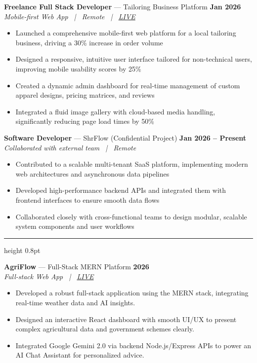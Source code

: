 \documentclass[10pt,a4paper]{article}
\newcommand{\resumesection}[1]{%
  \vspace{5pt}%
  \noindent{\large\textbf{#1}}\par
  \vspace{1pt}%
  \hrule height 0.8pt
  \vspace{3pt}%
}
\begin{document}
\noindent\textbf{Freelance Full Stack Developer} --- Tailoring Business Platform \hfill \textbf{Jan 2026} \\
\textit{Mobile-first Web App \ | \ Remote \ | \ \href{https://tailoring-red.vercel.app}{LIVE}}
\begin{itemize}[leftmargin=1.2em, topsep=1pt, itemsep=0pt, parsep=0pt]
    \item Launched a comprehensive mobile-first web platform for a local tailoring business, driving a 30\% increase in order volume
    \item Designed a responsive, intuitive user interface tailored for non-technical users, improving mobile usability scores by 25\%
    \item Created a dynamic admin dashboard for real-time management of custom apparel designs, pricing matrices, and reviews
    \item Integrated a fluid image gallery with cloud-based media handling, significantly reducing page load times by 50\%
\end{itemize}

\vspace{3pt}

\noindent\textbf{Software Developer} --- ShrFlow (Confidential Project) \hfill \textbf{Jan 2026 -- Present} \\
\textit{Collaborated with external team \ | \ Remote}
\begin{itemize}[leftmargin=1.2em, topsep=1pt, itemsep=0pt, parsep=0pt]
    \item Contributed to a scalable multi-tenant SaaS platform, implementing modern web architectures and asynchronous data pipelines
    \item Developed high-performance backend APIs and integrated them with frontend interfaces to ensure smooth data flows
    \item Collaborated closely with cross-functional teams to design modular, scalable system components and user workflows
\end{itemize}

\resumesection{PROJECTS}

\noindent\textbf{AgriFlow} --- Full-Stack MERN Platform \hfill \textbf{2026} \\
\textit{Full-stack Web App \ | \ \href{https://agriflow-frontend.onrender.com/}{LIVE}}
\begin{itemize}[leftmargin=1.2em, topsep=1pt, itemsep=0pt, parsep=0pt]
    \item Developed a robust full-stack application using the MERN stack, integrating real-time weather data and AI insights.
    \item Designed an interactive React dashboard with smooth UI/UX to present complex agricultural data and government schemes clearly.
    \item Integrated Google Gemini 2.0 via backend Node.js/Express APIs to power an AI Chat Assistant for personalized advice.
\end{itemize}
\end{document}
